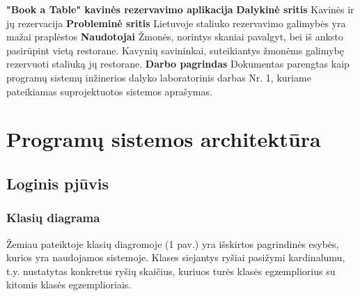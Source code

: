 \documentclass{VUMIFPSkursinis}
\begin{document}
\noindent
{\bfseries "Book a Table" kavinės rezervavimo aplikacija}
\newline
\newline
{\bfseries Dalykinė sritis}
\newline
Kavinės ir jų rezervacija
\newline
\newline
{\bfseries Probleminė sritis}
\newline
 Lietuvoje staliuko rezervavimo galimybės yra mažai praplėstos
\newline
\newline
{\bfseries Naudotojai}
\newline
Žmonės, norintys skaniai pavalgyt, bei iš anksto pasirūpint vietą restorane.
\newline
Kavynių savininkai, suteikiantys žmonėms galimybę rezervuoti staliuką jų restorane.
\newline
\newline
{\bfseries Darbo pagrindas}
\newline
Dokumentas parengtas kaip programų sistemų inžinerios dalyko laboratorinis darbas Nr. 1, kuriame pateikiamas suprojektuotos sistemos aprašymas.
\newline
\newline

\section{Programų sistemos architektūra}
\subsection{Loginis pjūvis}
\subsubsection{Klasių diagrama}



Žemiau pateiktoje klasių diagromoje (1 pav.) yra išskirtos pagrindinės esybės, kurios yra naudojamos sistemoje. Klases siejantys ryšiai pasižymi kardinalumu, t.y. nustatytas konkretus ryšių skaičius, kuriuos turės klasės egzempliorius su kitomis klasės egzemplioriais.
\newline
\newline
\end{document}
